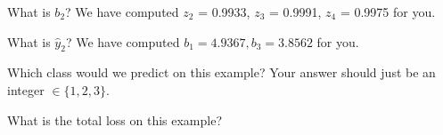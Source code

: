 \documentclass[11pt,addpoints,answers]{exam}
\begin{document}
\begin{questions}
\begin{parts}
\begin{subparts}
    \begin{your_solution}[title=$z_1$,height=2cm,width=3cm]
    \end{your_solution}
    \begin{your_solution}[title=Work,height=4cm,width=12cm]
    \end{your_solution}
    
    

    \subpart[1] What is $b_2$?  We have computed $z_2$ = 0.9933, $z_3$ = 0.9991, $z_4$ = 0.9975 for you.
    
   \begin{your_solution}[title=$b_2$,height=2cm,width=3cm]
    \end{your_solution}
    \begin{your_solution}[title=Work,height=4cm,width=12cm]
    \end{your_solution}
    
    \clearpage
    
    \subpart[1] What is $\hat{y}_2$? We have computed $b_1 = 4.9367, b_3 = 3.8562$ for you.
    
    \begin{your_solution}[title=$\hat{y}_2$,height=2cm,width=3cm]
    \end{your_solution}
    \begin{your_solution}[title=Work,height=4cm,width=12cm]
    \end{your_solution}

    \subpart[1] Which class would we predict on this example? Your answer should just be an integer $\in \{1, 2, 3\}$.
    
    \begin{your_solution}[title=Class,height=2cm,width=3cm]
    \end{your_solution}
    \begin{your_solution}[title=Work,height=4cm,width=12cm]
    \end{your_solution}
    
    
    \subpart[1] What is the total loss on this example?
    
    \begin{your_solution}[title=Loss,height=2cm,width=3cm]
    \end{your_solution}
    \begin{your_solution}[title=Work,height=4cm,width=12cm]
    \end{your_solution}
    

\end{subparts}
\end{parts}
\end{questions}
\end{document}
